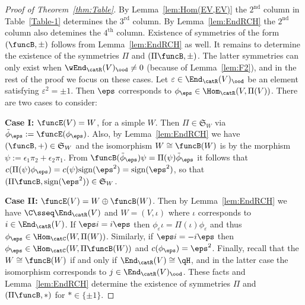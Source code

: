 \documentclass[12pt]{amsart}
\begin{document}
\begin{proof}[Proof of Theorem~\ref{thm:Table}]
By Lemma~\ref{lem:Hom(EV,EV)}
the $2^\mathrm{nd}$ column in Table~\ref{Table-1} determines the $3^\mathrm{rd}$ column. 
By Lemma~\ref{lem:EndRCH}  the $2^\mathrm{nd}$ column also detemines the $4^\mathrm{th}$ column. Existence of symmetries of the form $(\funcB,\pm )$
follows from Lemma~\ref{lem:EndRCH} as well. 
It remains to determine the existence of the symmetries $\Pi$ and $(\Pi\funcB,\pm)$. 
The latter symmetries can only exist when $\wEnd_\catR(V)_{\ood}\neq0$ (because of Lemma~\ref{lem:F2}), and in the rest of the proof we focus on these cases.  
Let  $\varepsilon\in\End_\catR(V)_\ood$ be an element satisfying $\varepsilon^2=\pm 1$. Then $\eps$ corresponds to $\phi_\eps\in\Hom_\catR(V,\Pi(V))$. There are two cases to consider:

\noindent\textbf{Case I:}
$\funcE(V)=W$, for a simple $W$.  Then  $\Pi\in\mathfrak S_W$ 
via $\tilde\phi_\eps:=\funcE(\phi_\eps)$.
Also, by Lemma~\ref{lem:EndRCH} we have $(\funcB,+)\in\mathfrak S_W$ and the isomorphism $W\cong \funcB(W)$ is by the morphism
$\psi:=\epsilon_1\pi_2+\epsilon_2\pi_1$. From $\funcB(\tilde\phi_\eps)\psi=\Pi(\psi)\tilde \phi_\eps$ it follows that 
$c(\Pi(\psi)\phi_\eps)=c(\psi)\mathrm{sign}(\eps^2)=\mathrm{sign}(\eps^2)$, so that 
$(\Pi\funcB,\mathrm{sign}(\eps^2))\in \mathfrak S_W$. 

\noindent\textbf{Case II:}
$\funcE(V)=W\oplus \funcB(W)$. Then  by Lemma~\ref{lem:EndRCH} we have $\C\sseq\End_\catR(V)$ and $W=(V,\iota)$ where $\iota$ corresponds to $i\in\End_\catR(V)$.  If $\eps i=i\eps$ then $\phi_\varepsilon\iota=\Pi(\iota)\phi_\varepsilon$ and thus $\phi_\eps\in\Hom_\catC(W,\Pi(W))$. Similarly, if $\eps i=-i\eps$ then $\phi_\eps\in \Hom_\catC(W,\Pi\funcB(W))$ and $c(\phi_\eps)=\eps^2$. Finally, recall that the $W\cong \funcB(W)$ if and only if $\End_\catR(V)\cong \qH$, and in the latter case the isomorphism corresponds to $j\in\End_\catR(V)_\ood$.
These facts and Lemma~\ref{lem:EndRCH} determine the existence of symmetries $\Pi$ and $(\Pi\funcB,*)$ for $*\in\{\pm 1\}$. 
\end{proof}
\end{document}
